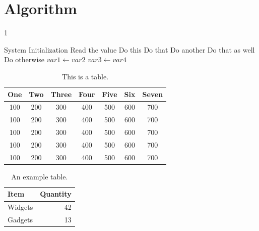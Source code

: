 \chapter{Algorithm}
\label{app:G}
\begin{spacing}{1}
\begin{algorithm}
\caption{Example table for algorithms}
\begin{algorithmic}[1]
       
    \State System Initialization
    \State Read the value 
        \State Do this
        \State Do that
        \State Do another
        \State Do that as well
        \Else
        \State Do otherwise
        \EndIf
    \EndIf
      
        \State $var1 \leftarrow var2$  
        \State $var3 \leftarrow var4$
    \EndWhile  \label{roy's loop}
\EndProcedure
\end{algorithmic}
\end{algorithm}
\end{spacing}

\begin{table}[ht]
\caption{This is a table.}
\centering
  \begin{tabular}{ccccccc}
    \toprule
    One & Two & Three & Four & Five & Six & Seven \\
    \midrule
    100 & 200 & 300 & 400 & 500 & 600 & 700 \\
    100 & 200 & 300 & 400 & 500 & 600 & 700 \\
    100 & 200 & 300 & 400 & 500 & 600 & 700 \\
    100 & 200 & 300 & 400 & 500 & 600 & 700 \\
    100 & 200 & 300 & 400 & 500 & 600 & 700 \\
    \bottomrule
  \end{tabular}
\end{table}

\begin{table}
\centering
\begin{tabular}{l|r}
Item & Quantity \\\hline
Widgets & 42 \\
Gadgets & 13
\end{tabular}
\caption{\label{tab:widgets}An example table.}
\end{table}

